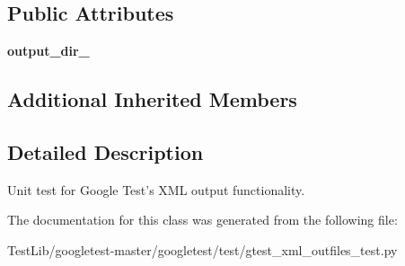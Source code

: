 \subsection*{Public Attributes}
\begin{DoxyCompactItemize}
\item 
\mbox{\label{classgtest__xml__outfiles__test_1_1GTestXMLOutFilesTest_aa5c31cd97047bc1d3060f4d27bc956a4}} 
{\bfseries output\+\_\+dir\+\_\+}
\end{DoxyCompactItemize}
\subsection*{Additional Inherited Members}


\subsection{Detailed Description}
\begin{DoxyVerb}Unit test for Google Test's XML output functionality.\end{DoxyVerb}
 

The documentation for this class was generated from the following file\+:\begin{DoxyCompactItemize}
\item 
Test\+Lib/googletest-\/master/googletest/test/gtest\+\_\+xml\+\_\+outfiles\+\_\+test.\+py\end{DoxyCompactItemize}
